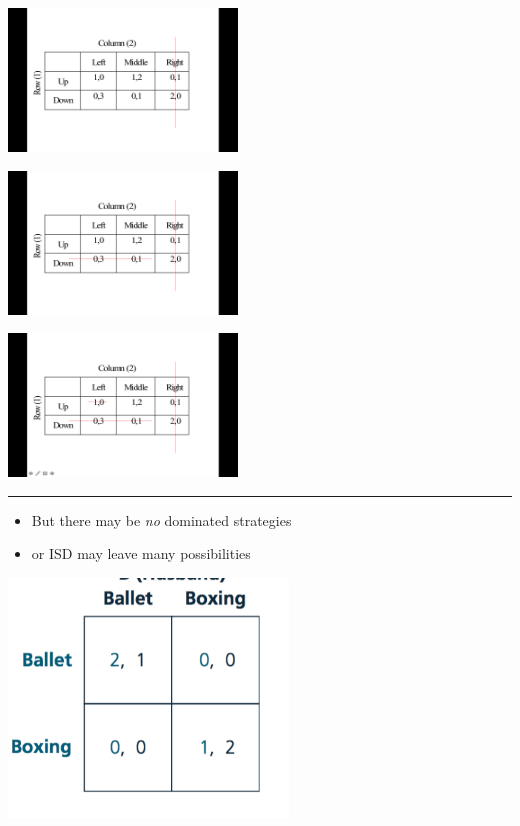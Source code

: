 \documentclass[]{article}
\providecommand{\tightlist}{%
  \setlength{\itemsep}{0pt}\setlength{\parskip}{0pt}}
\begin{document}
\includegraphics[height=1.5in]{picsfigs/isd1.png}

\includegraphics[height=1.5in]{picsfigs/isd2.png}

\includegraphics[height=1.5in]{picsfigs/isd3.png}

\begin{center}\rule{0.5\linewidth}{\linethickness}\end{center}

\begin{itemize}
\tightlist
\item
  But there may be \emph{no} dominated strategies
\item
  or ISD may leave many possibilities
\end{itemize}

\includegraphics[height=2.5in]{picsfigs/bossmall.png}
\end{document}
